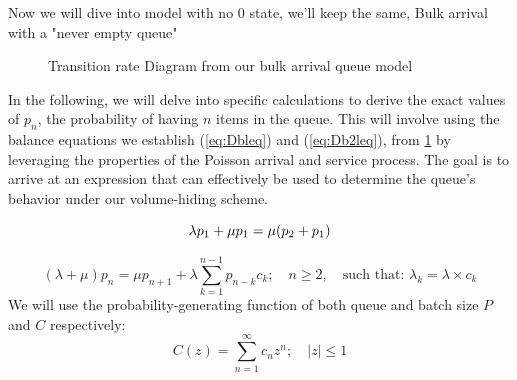 \documentclass{article}
\begin{document}
Now we will dive into model with no 0 state, we'll keep the same, Bulk arrival with a "never empty queue" 
\begin{figure}[H]
   \centering
\caption{Transition rate Diagram from our bulk arrival queue model}
    \label{fig:ctmc_dummy}
\end{figure}





In the following, we will delve into specific calculations to derive the exact values of $p_n$, the probability of having $n$ items in the queue. This will involve using the balance equations we establish (\ref{eq:Dbleq}) and (\ref{eq:Db2leq}), from \ref{fig:ctmc_dummy} by leveraging the properties of the Poisson arrival and service process. The goal is to arrive at an expression that can effectively be used to determine the queue's behavior under our volume-hiding scheme.




\begin{equation}
\lambda p_1 + \mu p_1= \mu(p_2 + p_1)\\
\label{eq:Dbleq}
\end{equation}

\begin{equation}
(\lambda + \mu) p_n = \mu p_{n+1} + \lambda \sum_{k=1}^{n-1} p_{n-k} c_k; \quad n \geq 2, \quad \text{such that: } \lambda_k = \lambda \times c_k
\label{eq:Db2leq}
\end{equation}
We will use the probability-generating function of both queue and batch size $P$ and $C$ respectively:
\begin{equation*}
C(z) = \sum_{n=1}^{\infty} c_n z^n; \quad |z| \leq 1
\end{equation*}
\end{document}
